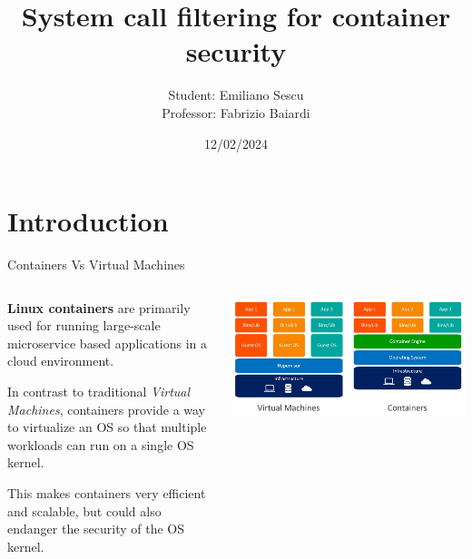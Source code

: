 \documentclass{beamer}
\title{System call filtering for container security}
\author{Student: Emiliano Sescu\\
Professor: Fabrizio Baiardi}
\date{12/02/2024}
\begin{document}
\maketitle

\section{Introduction}


\begin{frame}{Containers Vs Virtual Machines}

\begin{columns}
\begin{column}{0.45\textwidth}
\textbf{Linux containers} are primarily used for running large-scale microservice based applications in a cloud environment. 
\vspace{0.35cm}

In contrast to traditional \emph{Virtual Machines}, containers provide a way to virtualize an OS so that multiple workloads can run on a single OS kernel. 
\vspace{0.01cm}

This makes containers very efficient and scalable, but could also endanger the security of the OS kernel.
\end{column}
\begin{column}{0.55\textwidth}
\includegraphics[width=\textwidth]
{assets/containers-vs-virtual-machines}
\end{column}
\end{columns}
\end{frame}
\end{document}
